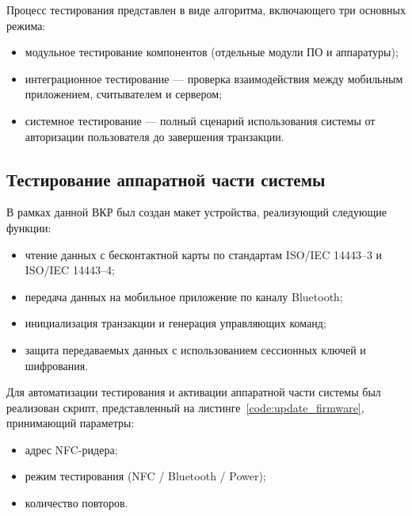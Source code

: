 Процесс тестирования представлен в виде алгоритма, включающего три основных режима:

\begin{itemize}
	\item модульное тестирование компонентов (отдельные модули ПО и аппаратуры);
	\item интеграционное тестирование — проверка взаимодействия между мобильным приложением, считывателем и сервером;
	\item системное тестирование — полный сценарий использования системы от авторизации пользователя до завершения транзакции.
\end{itemize}

\subsection{Тестирование аппаратной части системы}
В рамках данной ВКР был создан макет устройства, реализующий следующие функции:

\begin{itemize}
	\item чтение данных с бесконтактной карты по стандартам ISO/IEC 14443--3 и ISO/IEC 14443--4;
	\item передача данных на мобильное приложение по каналу Bluetooth;
	\item инициализация транзакции и генерация управляющих команд;
	\item защита передаваемых данных с использованием сессионных ключей и шифрования.
\end{itemize}

Для автоматизации тестирования и активации аппаратной части системы был реализован скрипт, представленный на листинге~\ref{code:update_firmware}, принимающий параметры:

\begin{itemize}
	\item адрес NFC-ридера;
	\item режим тестирования (NFC / Bluetooth / Power);
	\item количество повторов.
\end{itemize}


\begin{singlespacing}
	\small
	\captionsetup{labelsep=endash, justification=raggedright, singlelinecheck=off}
	
\end{singlespacing}


